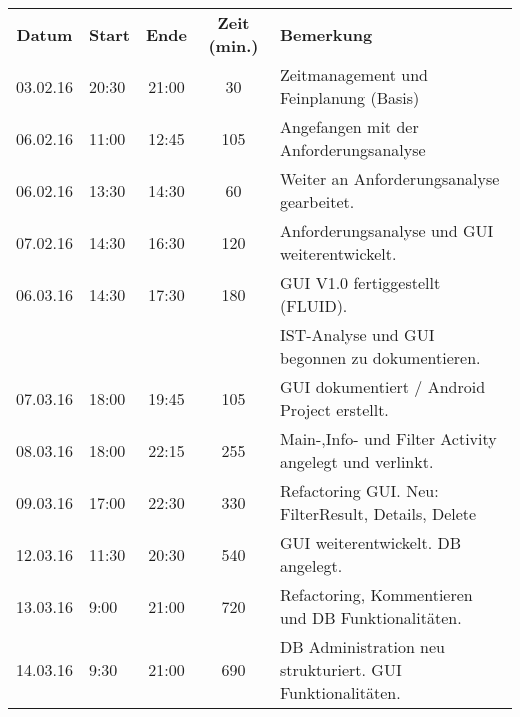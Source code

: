 \begin{tabular}{|c|l|c|c|l|}
	\rowcolor{black} {\color{white}\textbf{Datum}} & {\color{white}\textbf{Start}} & {\color{white}\textbf{Ende}} & {\color{white}\textbf{Zeit (min.)}} & {\color{white}\textbf{Bemerkung}} \\
	03.02.16 & 20:30 & 21:00 & 30 & Zeitmanagement und Feinplanung (Basis) \\ \hline
	\rowcolor{DarkSeaGreen} 06.02.16 & 11:00 & 12:45 & 105 & Angefangen mit der Anforderungsanalyse \\ \hline
	06.02.16 & 13:30 & 14:30 & 60 & Weiter an Anforderungsanalyse gearbeitet. \\ \hline
	\rowcolor{DarkSeaGreen} 07.02.16 & 14:30 & 16:30 & 120 & Anforderungsanalyse und GUI weiterentwickelt. \\ \hline
	06.03.16 & 14:30 & 17:30 & 180 & GUI V1.0 fertiggestellt (FLUID). \\ \hline
	\rowcolor{DarkSeaGreen} & & & & IST-Analyse und GUI begonnen zu dokumentieren. \\ \hline
	07.03.16 & 18:00 & 19:45 & 105 & GUI dokumentiert / Android Project erstellt. \\ \hline
	\rowcolor{DarkSeaGreen} 08.03.16 & 18:00 & 22:15 & 255 & Main-,Info- und Filter Activity angelegt und verlinkt. \\ \hline
	09.03.16 & 17:00 & 22:30 & 330 & Refactoring GUI. Neu: FilterResult, Details, Delete\\ \hline
	\rowcolor{DarkSeaGreen} 12.03.16 & 11:30 & 20:30 & 540 & GUI weiterentwickelt. DB angelegt. \\ \hline
	13.03.16 & 9:00 & 21:00 & 720 & Refactoring, Kommentieren und DB Funktionalitäten.\\ \hline
	\rowcolor{DarkSeaGreen} 14.03.16 & 9:30 & 21:00 & 690 & DB Administration neu strukturiert. GUI Funktionalitäten.\\ \hline
\end{tabular}